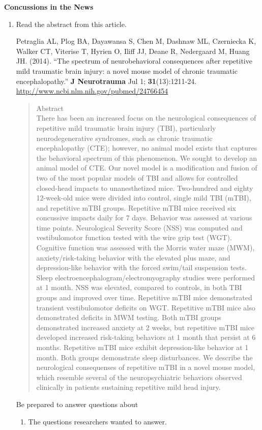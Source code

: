 \def\theTopic{Concussion Articles }

\begin{center}
{\bf {\large Concussions in the News}}\\
\end{center}


\begin{enumerate}
\item   Read the abstract from this  article.

Petraglia AL, Plog BA, Dayawansa S, Chen M, Dashnaw ML, Czerniecka K,
Walker CT, Viterise T, Hyrien O, Iliff JJ, Deane R, Nedergaard M,
Huang JH. (2014). ``The spectrum of neurobehavioral consequences after repetitive mild traumatic brain injury: a novel mouse model of chronic traumatic encephalopathy.''
{\bf J Neurotrauma} Jul 1; {\bf 31}(13):1211-24. 
\url{http://www.ncbi.nlm.nih.gov/pubmed/24766454}
{\footnotesize
\begin{quotation}
Abstract\\
There has been an increased focus on the neurological consequences of
repetitive mild traumatic brain injury (TBI), particularly
neurodegenerative syndromes, such as chronic traumatic encephalopathy
(CTE); however, no animal model exists that captures the behavioral
spectrum of this phenomenon. We sought to develop an animal model of
CTE. Our novel model is a modification and fusion of two of the most
popular models of TBI and allows for controlled closed-head impacts to
unanesthetized mice. Two-hundred and eighty 12-week-old mice were
divided into control, single mild TBI (mTBI), and repetitive mTBI
groups. Repetitive mTBI mice received six concussive impacts daily for
7 days. Behavior was assessed at various time points. Neurological
Severity Score (NSS) was computed and vestibulomotor function tested
with the wire grip test (WGT). Cognitive function was assessed with
the Morris water maze (MWM), anxiety/risk-taking behavior with the
elevated plus maze, and depression-like behavior with the forced
swim/tail suspension tests. Sleep
electroencephalogram/electromyography studies were performed at 1
month. NSS was elevated, compared to controls, in both TBI groups and
improved over time. Repetitive mTBI mice demonstrated transient
vestibulomotor deficits on WGT. Repetitive mTBI mice also demonstrated
deficits in MWM testing. Both mTBI groups demonstrated increased
anxiety at 2 weeks, but repetitive mTBI mice developed increased
risk-taking behaviors at 1 month that persist at 6 months. Repetitive
mTBI mice exhibit depression-like behavior at 1 month. Both groups
demonstrate sleep disturbances. We describe the neurological consequenses
of repetitive mTBI in a novel mouse model, which resemble several of
the neuropsychiatric behaviors observed clinically in patients
sustaining repetitive mild head injury.
\end{quotation}
}
 Be prepared to answer questions about 
\begin{enumerate}
\item  The questions researchers wanted to answer.
\begin{students}
 \vspace{1in}
\end{students}


\end{enumerate}
\end{enumerate}
